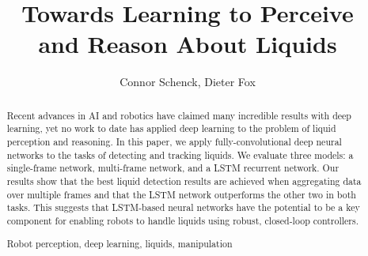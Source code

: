 \documentclass[runningheads,a4paper]{llncs}
\newcommand{\keywords}[1]{\par\addvspace\baselineskip
\noindent\keywordname\enspace\ignorespaces#1}
\begin{document}
\mainmatter  %

\title{Towards Learning to Perceive \\and Reason About Liquids \vspace{-0.5cm}}



%
%
\author{Connor Schenck, Dieter Fox \vspace{-0.3cm}}
%


%
%

\maketitle

\vspace{-0.5cm}
\begin{abstract}
Recent advances in AI and robotics have claimed many incredible results with deep learning, yet no work to date has applied deep learning to the problem of liquid perception and reasoning. In this paper, we apply fully-convolutional deep neural networks to the tasks of detecting and tracking liquids. We evaluate three models: a single-frame network, multi-frame network, and a LSTM recurrent network. Our results show that the best liquid detection results are achieved when aggregating data over multiple frames and that the LSTM network outperforms the other two in both tasks. This suggests that LSTM-based neural networks have the potential to be a key component for enabling robots to handle liquids using robust, closed-loop controllers.
\keywords{Robot perception, deep learning, liquids, manipulation}
\end{abstract}
\end{document}
